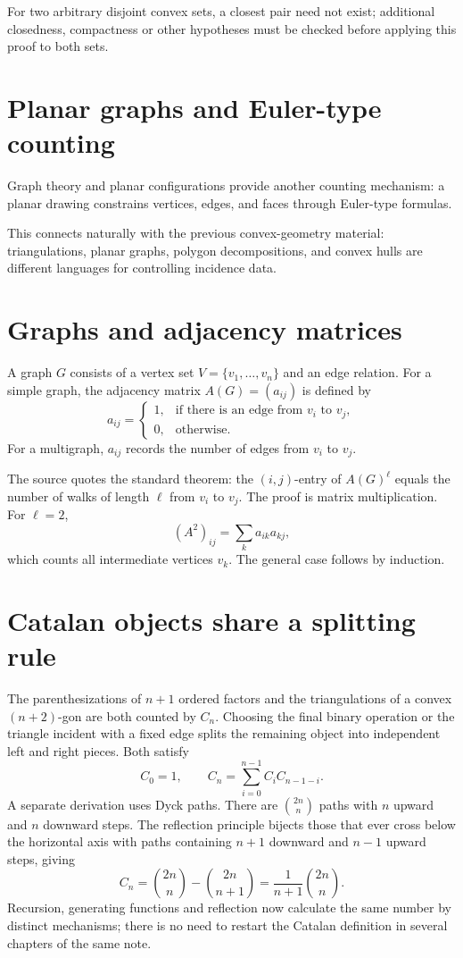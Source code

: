 For two arbitrary disjoint convex sets, a closest pair need not exist; additional closedness, compactness or other hypotheses must be checked before applying this proof to both sets.

\section{Planar graphs and Euler-type counting}

Graph theory and planar configurations provide another counting mechanism: a planar drawing constrains vertices, edges, and faces through Euler-type formulas.

This connects naturally with the previous convex-geometry material: triangulations, planar graphs, polygon decompositions, and convex hulls are different languages for controlling incidence data.

\section{Graphs and adjacency matrices}

A graph $G$ consists of a vertex set $V=\{v_1,\ldots,v_n\}$ and an edge relation.  For a simple graph, the adjacency matrix $A(G)=(a_{ij})$ is defined by
\[
  a_{ij}=
  \begin{cases}
  1,&\text{if there is an edge from }v_i\text{ to }v_j,\\
  0,&\text{otherwise.}
  \end{cases}
\]
For a multigraph, $a_{ij}$ records the number of edges from $v_i$ to $v_j$.

The source quotes the standard theorem: the $(i,j)$-entry of $A(G)^\ell$ equals the number of walks of length $\ell$ from $v_i$ to $v_j$.  The proof is matrix multiplication.  For $\ell=2$,
\[
  (A^2)_{ij}=\sum_k a_{ik}a_{kj},
\]
which counts all intermediate vertices $v_k$.  The general case follows by induction.

\enlargethispage{4\baselineskip}
\section{Catalan objects share a splitting rule}

The parenthesizations of \(n+1\) ordered factors and the triangulations of a convex \((n+2)\)-gon are both counted by \(C_n\). Choosing the final binary operation or the triangle incident with a fixed edge splits the remaining object into independent left and right pieces. Both satisfy
\[
 C_0=1,\qquad
 C_n=\sum_{i=0}^{n-1}C_iC_{n-1-i}.
\]
A separate derivation uses Dyck paths. There are \(\binom{2n}{n}\) paths with \(n\) upward and \(n\) downward steps. The reflection principle bijects those that ever cross below the horizontal axis with paths containing \(n+1\) downward and \(n-1\) upward steps, giving
\[
 C_n=\binom{2n}{n}-\binom{2n}{n+1}
 =\frac{1}{n+1}\binom{2n}{n}.
\]
Recursion, generating functions and reflection now calculate the same number by distinct mechanisms; there is no need to restart the Catalan definition in several chapters of the same note.

